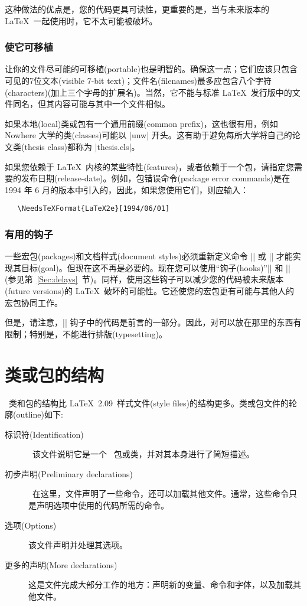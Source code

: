\documentclass{ltxguide}[1995/11/28]
\begin{document}
这种做法的优点是，您的代码更具可读性，更重要的是，当与未来版本的 \LaTeX{}\ 一起使用时，它不太可能被破坏。

\subsubsection[使它可移植]{\heiti 使它可移植}

让你的文件尽可能的可移植(portable)也是明智的。确保这一点；它们应该只包含可见的7位文本(visible 7-bit text)；文件名(filenames)最多应包含八个字符(characters)(加上三个字母的扩展名)。当然，它{\kaiti 不能}与标准 \LaTeX{}\ 发行版中的文件同名，但其内容可能与其中一个文件相似。

如果本地(local)类或包有一个通用前缀(common prefix)，这也很有用，例如 Nowhere 大学的类(classes)可能以 |unw| 开头。这有助于避免每所大学将自己的论文类(thesis class)都称为 |thesis.cls|。

如果您依赖于 \LaTeX{}\ 内核的某些特性(features)，或者依赖于一个包，请指定您需要的发布日期(release-date)。例如，包错误命令(package error commands)是在 1994 年 6 月的版本中引入的，因此，如果您使用它们，则应输入：
\begin{verbatim}
   \NeedsTeXFormat{LaTeX2e}[1994/06/01]
\end{verbatim}

\subsubsection[有用的钩子]{\heiti 有用的钩子}

一些宏包(packages)和文档样式(document styles)必须重新定义命令 |\document| 或 |\enddocument| 才能实现其目标(goal)。但现在这不再是必要的。现在您可以使用“钩子(hooks)”|\AtBeginDocument| 和 |\AtEndDocument| (参见第~\ref{Sec:delays}~节)。同样，使用这些钩子可以减少您的代码被未来版本(future versions)的 \LaTeX{}\ 破坏的可能性。它还使您的宏包更有可能与其他人的宏包协同工作。

但是，请注意，|\AtBeginDocument| 钩子中的代码是前言的一部分。因此，对可以放在那里的东西有限制；特别是，不能进行排版(typesetting)。


\newpage

\section{\heiti 类或包的结构}
\label{Sec:structure}

\LaTeXe{}\ 类和包的结构比 \LaTeX~2.09\ 样式文件(style files)的结构更多。类或包文件的轮廓(outline)如下:
\begin{description}
   \item[{\heiti 标识符}(Identification)] \ 该文件说明它是一个 \LaTeXe{}\ 包或类，并对其本身进行了简短描述。
   \item[{\heiti 初步声明}(Preliminary declarations)] \ 在这里，文件声明了一些命令，还可以加载其他文件。通常，这些命令只是声明选项中使用的代码所需的命令。
   \item[{\heiti 选项}(Options)] 该文件声明并处理其选项。
   \item[{\heiti 更多的声明}(More declarations)] 这是文件完成大部分工作的地方：声明新的变量、命令和字体，以及加载其他文件。
\end{description}
\end{document}
